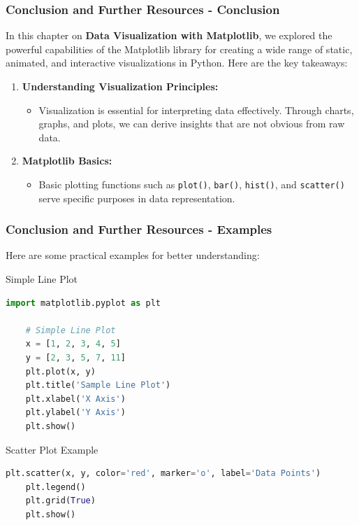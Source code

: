 \documentclass{beamer}
\begin{document}
\begin{frame}[fragile]
    \frametitle{Conclusion and Further Resources - Conclusion}
    In this chapter on \textbf{Data Visualization with Matplotlib}, we explored the powerful capabilities of the Matplotlib library for creating a wide range of static, animated, and interactive visualizations in Python. Here are the key takeaways:
    
    \begin{enumerate}
        \item \textbf{Understanding Visualization Principles:}
        \begin{itemize}
            \item Visualization is essential for interpreting data effectively. Through charts, graphs, and plots, we can derive insights that are not obvious from raw data.
        \end{itemize}
        
        \item \textbf{Matplotlib Basics:}
        \begin{itemize}
            \item Basic plotting functions such as \texttt{plot()}, \texttt{bar()}, \texttt{hist()}, and \texttt{scatter()} serve specific purposes in data representation.
        \end{itemize}
    \end{enumerate}
\end{frame}

\begin{frame}[fragile]
    \frametitle{Conclusion and Further Resources - Examples}
    Here are some practical examples for better understanding:

    \begin{block}{Simple Line Plot}
    \begin{lstlisting}[language=Python]
    import matplotlib.pyplot as plt

    # Simple Line Plot
    x = [1, 2, 3, 4, 5]
    y = [2, 3, 5, 7, 11]
    plt.plot(x, y)
    plt.title('Sample Line Plot')
    plt.xlabel('X Axis')
    plt.ylabel('Y Axis')
    plt.show()
    \end{lstlisting}
    \end{block}

    \begin{block}{Scatter Plot Example}
    \begin{lstlisting}[language=Python]
    plt.scatter(x, y, color='red', marker='o', label='Data Points')
    plt.legend()
    plt.grid(True)
    plt.show()
    \end{lstlisting}
    \end{block}
\end{frame}
\end{document}
